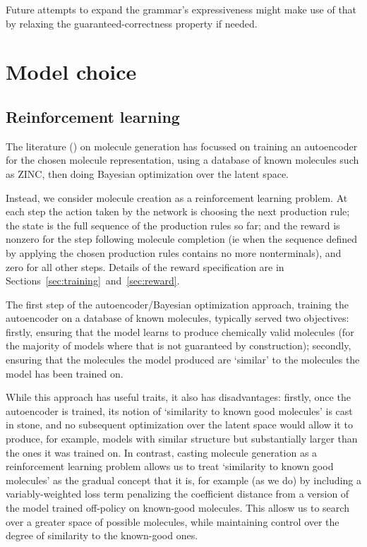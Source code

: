 \documentclass{article}
\begin{document}
Future attempts to expand the grammar's expressiveness might make use of that by relaxing the guaranteed-correctness property if needed.



\section{Model choice}
\subsection{Reinforcement learning}
The literature (\cite{Gomez-Bombarelli16, kusner17, jin18, kajino18}) on molecule generation has focussed on training an autoencoder for the chosen molecule representation, using a database of known molecules such as ZINC, then doing Bayesian optimization over the latent space. 

Instead, we consider molecule creation as a reinforcement learning problem. At each step the action taken by the network is choosing the next production rule; the state is the full sequence of the production rules so far; and the reward is nonzero for the step following molecule completion (ie when the sequence defined by applying the chosen production rules contains no more nonterminals), and zero for all other steps. Details of the reward specification are in Sections~\ref{sec:training}~and~\ref{sec:reward}.

The first step of the autoencoder/Bayesian optimization approach, training the autoencoder on a database of known molecules, typically served two objectives: firstly, ensuring that the model learns to produce chemically valid molecules (for the majority of models where that is not guaranteed by construction); secondly, ensuring that the molecules the model produced are `similar' to the molecules the model has been trained on.

While this approach has useful traits, it also has disadvantages: firstly, once the autoencoder is trained, its notion of `similarity to known good molecules' is cast in stone, and no subsequent optimization over the latent space would allow it to produce, for example, models with similar structure but substantially larger than the ones it was trained on. In contrast, casting molecule generation as a reinforcement learning problem allows us to treat `similarity to known good molecules' as the gradual concept that it is, for example (as we do) by including a variably-weighted loss term penalizing the coefficient distance from a version of the model trained off-policy on known-good molecules. This allosw us to search over a greater space of possible molecules, while maintaining control over the degree of similarity to the known-good ones.
\end{document}
